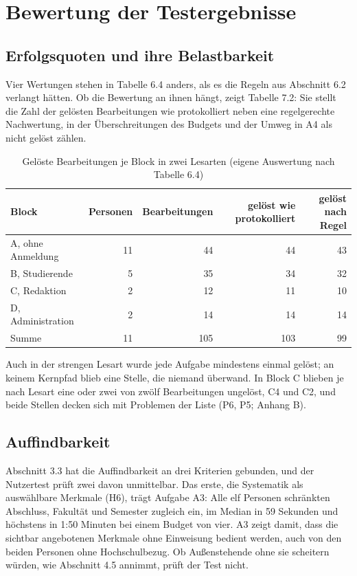 \section{Bewertung der Testergebnisse}
\label{sec:bewertung-testergebnisse}

\subsection{Erfolgsquoten und ihre Belastbarkeit}

Vier Wertungen stehen in Tabelle 6.4 anders, als es die Regeln aus Abschnitt 6.2 verlangt hätten. Ob die Bewertung an ihnen hängt, zeigt Tabelle 7.2: Sie stellt die Zahl der gelösten Bearbeitungen wie protokolliert neben eine regelgerechte Nachwertung, in der Überschreitungen des Budgets und der Umweg in A4 als nicht gelöst zählen.

\begin{table}[htbp]
	\centering
	\small
	\caption[Gelöste Bearbeitungen je Block in zwei Lesarten]{Gelöste Bearbeitungen je Block in zwei Lesarten (eigene Auswertung nach Tabelle 6.4)}
	\label{tab:lesarten}
	\begin{tabularx}{\textwidth}{@{}L{3.8cm}RRRR@{}}
		\toprule
		\textbf{Block} & \textbf{Personen} & \textbf{Bearbeitungen} & \textbf{gelöst wie protokolliert} & \textbf{gelöst nach Regel} \\
		\midrule
		A, ohne Anmeldung & 11 & 44 & 44 & 43 \\
		B, Studierende & 5 & 35 & 34 & 32 \\
		C, Redaktion & 2 & 12 & 11 & 10 \\
		D, Administration & 2 & 14 & 14 & 14 \\
		\midrule
		Summe & 11 & 105 & 103 & 99 \\
		\bottomrule
	\end{tabularx}
\end{table}

Auch in der strengen Lesart wurde jede Aufgabe mindestens einmal gelöst; an keinem Kernpfad blieb eine Stelle, die niemand überwand. In Block C blieben je nach Lesart eine oder zwei von zwölf Bearbeitungen ungelöst, C4 und C2, und beide Stellen decken sich mit Problemen der Liste (P6, P5; Anhang B).

\subsection{Auffindbarkeit}

Abschnitt 3.3 hat die Auffindbarkeit an drei Kriterien gebunden, und der Nutzertest prüft zwei davon unmittelbar. Das erste, die Systematik als auswählbare Merkmale (H6), trägt Aufgabe A3: Alle elf Personen schränkten Abschluss, Fakultät und Semester zugleich ein, im Median in 59 Sekunden und höchstens in 1:50 Minuten bei einem Budget von vier. A3 zeigt damit, dass die sichtbar angebotenen Merkmale ohne Einweisung bedient werden, auch von den beiden Personen ohne Hochschulbezug. Ob Außenstehende ohne sie scheitern würden, wie Abschnitt 4.5 annimmt, prüft der Test nicht.

